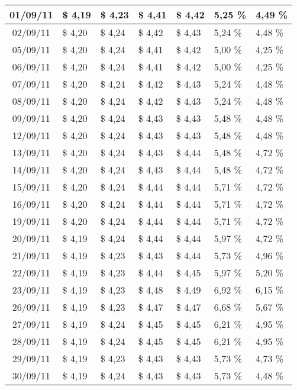 \begin{center}
\begin{longtable}{|c|p{1.5cm}|p{1.5cm}|p{1.5cm}|p{1.5cm}|p{1.5cm}|p{1.5cm}|}
01/09/11 & \$ 4,19 & \$ 4,23 & \$ 4,41 & \$ 4,42 & 5,25 \% & 4,49 \% \\ \hline
02/09/11 & \$ 4,20 & \$ 4,24 & \$ 4,42 & \$ 4,43 & 5,24 \% & 4,48 \% \\ \hline
05/09/11 & \$ 4,20 & \$ 4,24 & \$ 4,41 & \$ 4,42 & 5,00 \% & 4,25 \% \\ \hline
06/09/11 & \$ 4,20 & \$ 4,24 & \$ 4,41 & \$ 4,42 & 5,00 \% & 4,25 \% \\ \hline
07/09/11 & \$ 4,20 & \$ 4,24 & \$ 4,42 & \$ 4,43 & 5,24 \% & 4,48 \% \\ \hline
08/09/11 & \$ 4,20 & \$ 4,24 & \$ 4,42 & \$ 4,43 & 5,24 \% & 4,48 \% \\ \hline
09/09/11 & \$ 4,20 & \$ 4,24 & \$ 4,43 & \$ 4,43 & 5,48 \% & 4,48 \% \\ \hline
12/09/11 & \$ 4,20 & \$ 4,24 & \$ 4,43 & \$ 4,43 & 5,48 \% & 4,48 \% \\ \hline
13/09/11 & \$ 4,20 & \$ 4,24 & \$ 4,43 & \$ 4,44 & 5,48 \% & 4,72 \% \\ \hline
14/09/11 & \$ 4,20 & \$ 4,24 & \$ 4,43 & \$ 4,44 & 5,48 \% & 4,72 \% \\ \hline
15/09/11 & \$ 4,20 & \$ 4,24 & \$ 4,44 & \$ 4,44 & 5,71 \% & 4,72 \% \\ \hline
16/09/11 & \$ 4,20 & \$ 4,24 & \$ 4,44 & \$ 4,44 & 5,71 \% & 4,72 \% \\ \hline
19/09/11 & \$ 4,20 & \$ 4,24 & \$ 4,44 & \$ 4,44 & 5,71 \% & 4,72 \% \\ \hline
20/09/11 & \$ 4,19 & \$ 4,24 & \$ 4,44 & \$ 4,44 & 5,97 \% & 4,72 \% \\ \hline
21/09/11 & \$ 4,19 & \$ 4,23 & \$ 4,43 & \$ 4,44 & 5,73 \% & 4,96 \% \\ \hline
22/09/11 & \$ 4,19 & \$ 4,23 & \$ 4,44 & \$ 4,45 & 5,97 \% & 5,20 \% \\ \hline
23/09/11 & \$ 4,19 & \$ 4,23 & \$ 4,48 & \$ 4,49 & 6,92 \% & 6,15 \% \\ \hline
26/09/11 & \$ 4,19 & \$ 4,23 & \$ 4,47 & \$ 4,47 & 6,68 \% & 5,67 \% \\ \hline
27/09/11 & \$ 4,19 & \$ 4,24 & \$ 4,45 & \$ 4,45 & 6,21 \% & 4,95 \% \\ \hline
28/09/11 & \$ 4,19 & \$ 4,24 & \$ 4,45 & \$ 4,45 & 6,21 \% & 4,95 \% \\ \hline
29/09/11 & \$ 4,19 & \$ 4,23 & \$ 4,43 & \$ 4,43 & 5,73 \% & 4,73 \% \\ \hline
30/09/11 & \$ 4,19 & \$ 4,24 & \$ 4,43 & \$ 4,43 & 5,73 \% & 4,48 \% \\ \hline

\end{longtable}
\end{center}
